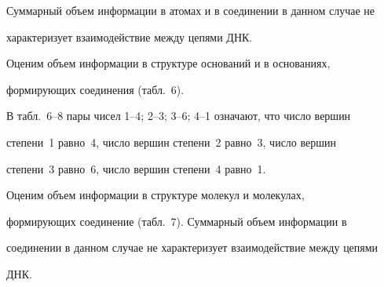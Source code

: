    


   Суммарный объем информации в атомах и в соединении в данном случае не 


характеризует взаимодействие между цепями ДНК. 


   


     Оценим объем информации в структуре оснований и в основаниях, 


формирующих соединения (табл.~6).


   


   В табл.~6--8 пары чисел 1--4; 2--3; 3--6; 4--1 означают, что число вершин 


степени~1 равно~4, чис\-ло вершин степени~2 равно~3, число вершин 


степени~3 равно~6, чис\-ло вершин степени~4 равно~1.





     Оценим объем информации в структуре молекул и молекулах, 


формирующих соединение (табл.~7). Суммарный объем информации в 


соединении в данном случае не характеризует взаимодействие между цепями 


ДНК. 





\addtocounter{table}{-1}



